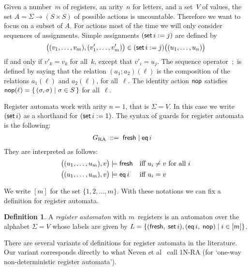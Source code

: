 \documentclass[9pt, preprint]{sigplanconf} %
\theoremstyle{definition}
\newtheorem{definition}{Definition}
\theoremstyle{remark}
\begin{document}
\smallskip

Given a number~$m$ of registers, an arity~$n$ for letters, and a set~$V$ of values, the set $A=\Sigma\to(S\times S)$ of possible actions is uncountable. Therefore we want to focus on a subset of $A$.
For actions most of the time we will only consider sequences of assignments.
Simple assignments $({\sf set}\,i:=j)$ are defined by 
\[ \bigl((v_1,\ldots,v_m),(v'_1,\ldots,v'_m)\bigr)\in
  ({\sf set}\,i:=j)\bigl((u_1,\ldots,u_n)\bigr) \]
if and only if $v'_k=v_k$ for all~$k$, except that $v'_i=u_j$.
The sequence operator~$;$ is defined by saying that the relation $(a_1;a_2)(\ell)$ is the composition of the relations $a_1(\ell)$ and $a_2(\ell)$, for all~$\ell$.
The identity action ${\sf nop}$ satisfies ${\sf nop}(\ell)=\{\,(\sigma,\sigma)\mid\sigma\in S\,\}$ for all~$\ell$.

Register automata work with arity $n=1$, that is $\Sigma=V$.
In this case we write $({\sf set}\,i)$ as a shorthand for $({\sf set}\,i:=1)$.
The syntax of guards for register automata is the following:
\begin{align*}
G_{\rm RA} &\;::=\; {\sf fresh} \mid {\sf eq}\,i
\end{align*}
They are interpreted as follows:
\begin{align*}
\bigl((u_1,\ldots,u_m),v\bigr)&\models{\sf fresh}
  &&\text{iff $u_i\ne v$ for all $i$} \\
\bigl((u_1,\ldots,u_m),v\bigr)&\models{\sf eq}\,i
  &&\text{iff $u_i=v$}
\end{align*}

We write $[m]$ for the set $\{1,2,\ldots,m\}$.
With these notations we can fix a definition for register automata.

\begin{definition}
A \emph{register automaton} with $m$~registers is an automaton over the alphabet $\Sigma=V$ whose labels 
are given by $L=\{({\sf fresh},\;{\sf set}\,i), ({\sf eq}\,i,\; {\sf nop})  \mid i\in[m] \}$.
\label{def:ra}
\end{definition}

There are several variants of definitions for register automata in the literature.
Our variant corresponds directly to what Neven et al~\cite{dblp:conf/mfcs/nevensv01} call 1N-RA (for `one-way non-deterministic register automata').
\end{document}
